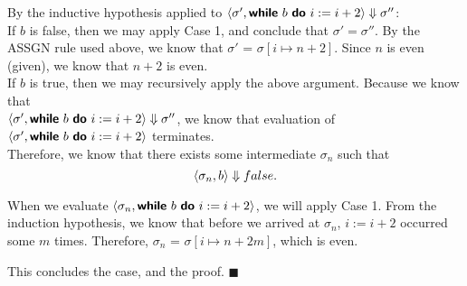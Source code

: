 \documentclass[11pt]{article}
\begin{document}
By the inductive hypothesis applied to ${\langle \sigma', \text{\textsf{\textbf{while}}}~b~\text{\textsf{\textbf{do}}}~i := i+2 \rangle} \Downarrow \sigma''$:\\

\indent If $b$ is false, then we may apply Case 1, and conclude that $\sigma' = \sigma''$. By the ASSGN rule used above, we know that $\sigma'$ = $\sigma [i \mapsto n + 2]$. Since $n$ is even (given), we know that $n + 2$ is even. \checkmark \\ 

\indent If $b$ is true, then we may recursively apply the above argument. Because we know that\\ ${\langle \sigma', \text{\textsf{\textbf{while}}}~b~\text{\textsf{\textbf{do}}}~i := i+2 \rangle} \Downarrow \sigma''$, we know that evaluation of ${\langle \sigma', \text{\textsf{\textbf{while}}}~b~\text{\textsf{\textbf{do}}}~i := i+2 \rangle}$ terminates.\\
Therefore, we know that there exists some intermediate $\sigma_n$ such that $$\langle \sigma_n, b \rangle\Downarrow false.$$

When we evaluate ${\langle \sigma_n, \text{\textsf{\textbf{while}}}~b~\text{\textsf{\textbf{do}}}~i := i+2 \rangle}$, we will apply Case 1. From the induction hypothesis, we know that before we arrived at $\sigma_n$, $i := i + 2$ occurred some $m$ times. Therefore, $\sigma_n$ = $\sigma [i \mapsto n + 2m]$, which is even. \checkmark

This concludes the case, and the proof. $\blacksquare$

\end{document}
